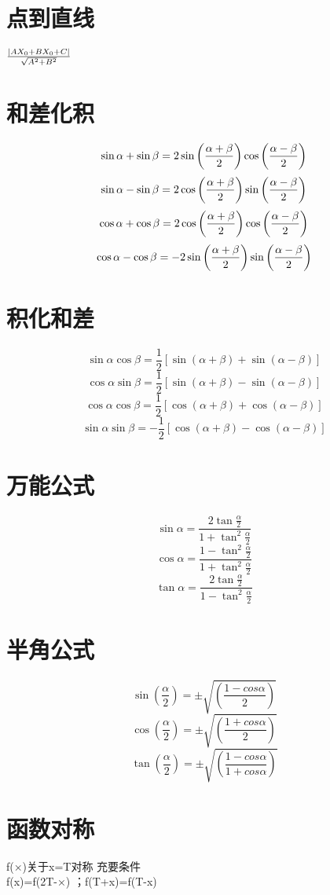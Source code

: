 \documentclass[UTF8]{ctexart}
\begin{document}
\section{点到直线}
$ {\left |{AX_0+BX_0+C} \right |} \over \sqrt{A^2+B^2} $

\section{和差化积}
$$ \sin \alpha + \sin \beta = 2 \sin { \left ( {\alpha + \beta } \over 2 \right ) } \cos \left ( {\alpha - \beta } \over 2 \right ) $$
$$\sin \alpha - \sin \beta = 2 \cos { \left ( {\alpha + \beta } \over 2 \right ) } \sin \left ( {\alpha - \beta } \over 2 \right ) $$
$$ \cos \alpha + \cos \beta = 2 \cos { \left ( {\alpha + \beta } \over 2 \right ) } \cos \left ( {\alpha - \beta } \over 2 \right )$$
$$ \cos \alpha - \cos \beta = -2 \sin { \left ( {\alpha + \beta } \over 2 \right ) } \sin \left ( {\alpha - \beta } \over 2 \right )$$

\section{积化和差}
$$ \sin \alpha \cos \beta = \frac{1}{2} \left [ \sin(\alpha+\beta)+\sin(\alpha-\beta) \right ]$$
$$ \cos \alpha \sin \beta = \frac{1}{2} \left [ \sin(\alpha+\beta)-\sin(\alpha-\beta) \right ]$$
$$ \cos \alpha \cos \beta = \frac{1}{2} \left [ \cos(\alpha+\beta)+\cos(\alpha-\beta) \right ]$$
$$ \sin \alpha \sin \beta =- \frac{1}{2} \left [ \cos(\alpha+\beta)-\cos(\alpha-\beta) \right ]$$

\section{万能公式}
$$ \sin\alpha=\frac{2\tan \frac{\alpha}{2}}{1+\tan^2 \frac{\alpha}{2}}$$
$$ \cos \alpha =\frac {1-\tan^2\frac{\alpha}{2}}{1+\tan^2\frac{\alpha}{2}}$$
$$ \tan\alpha=\frac{2\tan \frac{\alpha}{2}}{1-\tan^2 \frac{\alpha}{2}}$$

\section{半角公式}
$$ \sin \left(\frac{\alpha}{2} \right)=\pm \sqrt{\left(\frac{1-cos \alpha}{2}\right)}$$
$$ \cos \left(\frac{\alpha}{2} \right)=\pm \sqrt{\left(\frac{1+cos \alpha}{2}\right)}$$
$$ \tan \left(\frac{\alpha}{2} \right)=\pm \sqrt{\left(\frac{1-cos \alpha}{1+cos \alpha}\right)}$$

\section{函数对称}
f(×)关于x=T对称  充要条件 \\
f(x)=f(2T-×)  ；f(T+x)=f(T-x)
\end{document}
